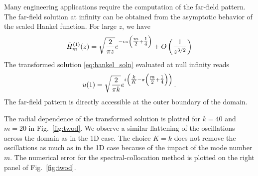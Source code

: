 \documentclass[draft,onefignum,onetabnum]{siamart190516}
\newcommand{\iu}{{i\mkern1mu}}
\begin{document}
Many engineering applications require the computation of the far-field pattern. The far-field solution at infinity can be obtained from the asymptotic behavior of the scaled Hankel function. For large $z$, we have \cite{olver1972bessel}
\[ \bar{H}_{m}^{(1)}(z) = \sqrt{\frac{2}{\pi z}} e^{-\iu \pi \left(\tfrac{m}{2}+\tfrac{1}{4} \right)} + O\left(\frac{1}{z^{3/2}}\right) \]
The transformed solution \eqref{eq:hankel_soln} evaluated at null infinity reads
\[ u(1) = \sqrt{\frac{2}{\pi k}} e^{\iu \left(\tfrac{k}{K}- \pi \left(\tfrac{m}{2}+\tfrac{1}{4} \right) \right)}\,. \]
The far-field pattern is directly accessible at the outer boundary of the domain.

The radial dependence of the transformed solution is plotted for $k=40$ and $m=20$ in Fig.~\ref{fig:twod}. We observe a similar flattening of the oscillations across the domain as in the 1D case. The choice $K=k$ does not remove the oscillations as much as in the 1D case because of the impact of the mode number $m$. The numerical error for the spectral-collocation method is plotted on the right panel of Fig.~\ref{fig:twod}. 
\end{document}
